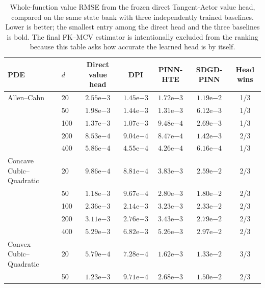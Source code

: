 \documentclass[10pt]{article}
\begin{document}
\begin{table}[t]
\centering
\caption{Whole-function value RMSE from the frozen direct Tangent-Actor value head, compared on the same state bank with three independently trained baselines. Lower is better; the smallest entry among the direct head and the three baselines is bold. The final FK--MCV estimator is intentionally excluded from the ranking because this table asks how accurate the learned head is by itself.}
\label{tab:value-head-full-dimension}
\small
\setlength{\tabcolsep}{5.2pt}
\begin{tabular}{llccccc}
\toprule
PDE & $d$ & Direct value head & DPI & PINN-HTE & SDGD-PINN & Head wins \\
\midrule
Allen--Cahn & 20 & $2.55\mathrm{e}{-3}$ & \textbf{$1.45\mathrm{e}{-3}$} & $1.72\mathrm{e}{-3}$ & $1.19\mathrm{e}{-2}$ & 1/3 \\
 & 50 & $1.98\mathrm{e}{-3}$ & $1.44\mathrm{e}{-3}$ & \textbf{$1.31\mathrm{e}{-3}$} & $6.12\mathrm{e}{-3}$ & 1/3 \\
 & 100 & $1.37\mathrm{e}{-3}$ & $1.07\mathrm{e}{-3}$ & \textbf{$9.48\mathrm{e}{-4}$} & $2.69\mathrm{e}{-3}$ & 1/3 \\
 & 200 & $8.53\mathrm{e}{-4}$ & $9.04\mathrm{e}{-4}$ & \textbf{$8.47\mathrm{e}{-4}$} & $1.42\mathrm{e}{-3}$ & 2/3 \\
 & 400 & $5.86\mathrm{e}{-4}$ & $4.55\mathrm{e}{-4}$ & \textbf{$4.26\mathrm{e}{-4}$} & $6.16\mathrm{e}{-4}$ & 1/3 \\
\addlinespace[2pt]
Concave Cubic--Quadratic & 20 & $9.86\mathrm{e}{-4}$ & \textbf{$8.81\mathrm{e}{-4}$} & $3.83\mathrm{e}{-3}$ & $2.59\mathrm{e}{-2}$ & 2/3 \\
 & 50 & $1.18\mathrm{e}{-3}$ & \textbf{$9.67\mathrm{e}{-4}$} & $2.80\mathrm{e}{-3}$ & $1.80\mathrm{e}{-2}$ & 2/3 \\
 & 100 & $2.36\mathrm{e}{-3}$ & \textbf{$2.14\mathrm{e}{-3}$} & $3.23\mathrm{e}{-3}$ & $2.33\mathrm{e}{-2}$ & 2/3 \\
 & 200 & $3.11\mathrm{e}{-3}$ & \textbf{$2.76\mathrm{e}{-3}$} & $3.43\mathrm{e}{-3}$ & $2.79\mathrm{e}{-2}$ & 2/3 \\
 & 400 & $5.29\mathrm{e}{-3}$ & $6.82\mathrm{e}{-3}$ & \textbf{$5.26\mathrm{e}{-3}$} & $2.97\mathrm{e}{-2}$ & 2/3 \\
\addlinespace[2pt]
Convex Cubic--Quadratic & 20 & \textbf{$5.79\mathrm{e}{-4}$} & $7.28\mathrm{e}{-4}$ & $1.62\mathrm{e}{-3}$ & $1.33\mathrm{e}{-2}$ & 3/3 \\
 & 50 & $1.23\mathrm{e}{-3}$ & \textbf{$9.71\mathrm{e}{-4}$} & $2.68\mathrm{e}{-3}$ & $1.50\mathrm{e}{-2}$ & 2/3 \\

\end{tabular}
\end{table}
\end{document}
